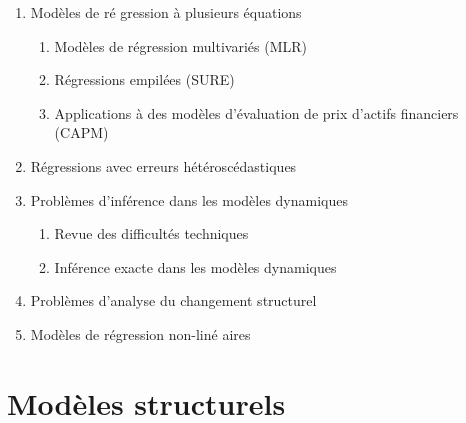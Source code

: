 \documentclass[titlepage,11pt,amstex]{article}
\begin{document}
\begin{enumerate}
\item \label{Multiple equations linear regressions}Mod\`{e}les de r\'{e}%
gression \`{a} plusieurs \'{e}quations

\begin{enumerate}
\item \label{MLR}Mod\`{e}les de r\'{e}gression multivari\'{e}s (MLR)

\item \label{SURE}R\'{e}gressions empil\'{e}es (SURE)

\item \label{CAPM}Applications \`{a} des mod\`{e}les d'\'{e}valuation de
prix d'actifs financiers (CAPM)
\end{enumerate}

\item \label{Regressions with heteroskedasticity}R\'{e}gressions avec
erreurs h\'{e}t\'{e}rosc\'{e}dastiques

\item \label{Inference in dynamic models}Probl\`{e}mes d'inf\'{e}rence dans
les mod\`{e}les dynamiques

\begin{enumerate}
\item \label{Technical difficulties}Revue des difficult\'{e}s techniques

\item \label{Exact inference methods in dynamic models}Inf\'{e}rence exacte
dans les mod\`{e}les dynamiques
\end{enumerate}

\item \label{Structural change analysis}Probl\`{e}mes d'analyse du
changement structurel

\item \label{Nonlinear regression}Mod\`{e}les de r\'{e}gression non-lin\'{e}%
aires
\end{enumerate}

\section{Mod\`{e}les structurels}
\end{document}
